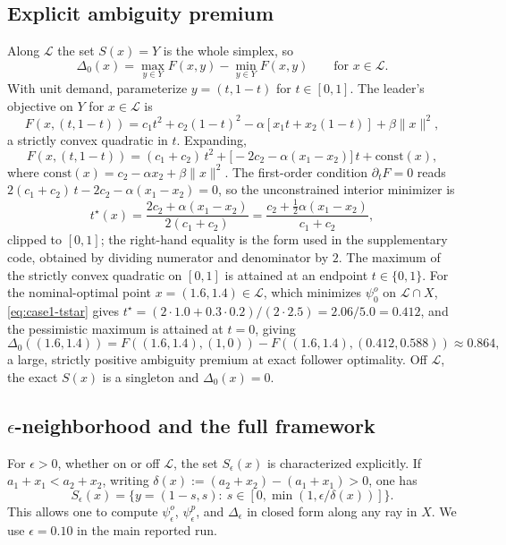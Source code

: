 \documentclass[11pt]{article}
\theoremstyle{definition}
\newcommand{\eps}{\epsilon}
\begin{document}
\subsection{Explicit ambiguity premium}
Along $\mathcal L$ the set $S(x)=Y$ is the whole simplex, so
\begin{equation}\label{eq:case1-delta-L}
  \Delta_0(x)=\max_{y\in Y}F(x,y)-\min_{y\in Y}F(x,y)
  \qquad\text{for }x\in\mathcal L.
\end{equation}
With unit demand, parameterize $y=(t,1-t)$ for $t\in[0,1]$. The
leader's objective on $Y$ for $x\in\mathcal L$ is
\begin{equation}\label{eq:case1-F-t}
  F(x,(t,1-t))
  =c_1 t^2+c_2(1-t)^2-\alpha[x_1 t+x_2(1-t)]+\beta\|x\|^2,
\end{equation}
a strictly convex quadratic in $t$. Expanding,
\begin{equation}\label{eq:case1-F-quadratic}
  F(x,(t,1-t))
  =(c_1+c_2)\,t^2
  +\bigl[-2c_2-\alpha(x_1-x_2)\bigr]\,t
  +\text{const}(x),
\end{equation}
where $\text{const}(x)=c_2-\alpha x_2+\beta\|x\|^2$. The first-order
condition $\partial_t F=0$ reads
$2(c_1+c_2)\,t-2c_2-\alpha(x_1-x_2)=0$, so the unconstrained
interior minimizer is
\begin{equation}\label{eq:case1-tstar}
  t^\star(x)
  =\frac{2c_2+\alpha(x_1-x_2)}{2(c_1+c_2)}
  =\frac{c_2+\tfrac12\alpha(x_1-x_2)}{c_1+c_2},
\end{equation}
clipped to $[0,1]$; the right-hand equality is the form used in
the supplementary code, obtained by dividing numerator and
denominator by $2$. The maximum of the strictly convex quadratic
on $[0,1]$ is attained at an endpoint $t\in\{0,1\}$. For the
nominal-optimal point $x=(1.6,1.4)\in\mathcal L$, which minimizes
$\psi_0^o$ on $\mathcal L\cap X$,
\eqref{eq:case1-tstar} gives
$t^\star=(2\cdot 1.0+0.3\cdot 0.2)/(2\cdot 2.5)=2.06/5.0=0.412$,
and the pessimistic maximum is attained at $t=0$, giving
\begin{equation}\label{eq:case1-exact-delta}
  \Delta_0((1.6,1.4))=
  F((1.6,1.4),(1,0))-F((1.6,1.4),(0.412,0.588))
  \approx 0.864,
\end{equation}
a large, strictly positive ambiguity premium at exact follower
optimality. Off $\mathcal L$, the exact $S(x)$ is a singleton and
$\Delta_0(x)=0$.

\subsection{$\eps$-neighborhood and the full framework}
For $\eps>0$, whether on or off $\mathcal L$, the set $S_\eps(x)$
is characterized explicitly. If $a_1+x_1<a_2+x_2$, writing
$\delta(x):=(a_2+x_2)-(a_1+x_1)>0$, one has
\begin{equation}\label{eq:case1-Seps}
  S_\eps(x)=\{y=(1-s,s):\ s\in[0,\min(1,\eps/\delta(x))]\}.
\end{equation}
This allows one to compute $\psi_\eps^o$, $\psi_\eps^p$, and
$\Delta_\eps$ in closed form along any ray in $X$. We use
$\eps=0.10$ in the main reported run.
\end{document}
